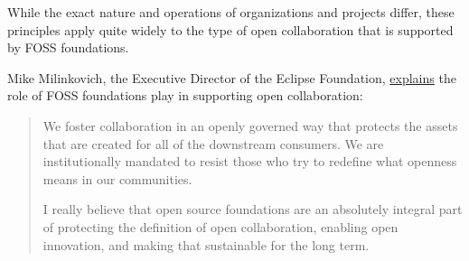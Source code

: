 While the exact nature and operations of organizations and projects differ, these principles apply quite widely to the type of open collaboration that is supported by FOSS foundations.

\begin{kaobox}[frametitle=FOSS foundations: protecting the definition of open collaboration]

Mike Milinkovich, the Executive Director of the Eclipse Foundation, \href{https://twitter.com/stephenrwalli/status/1358884485387808768}{explains} the role of FOSS foundations play in supporting open collaboration:

\begin{quote}

We foster collaboration in an openly governed way that protects the assets that are created for all of the downstream consumers. We are institutionally mandated to resist those who try to redefine what openness means in our communities.

I really believe that open source foundations are an absolutely integral part of protecting the definition of open collaboration, enabling open innovation, and making that sustainable for the long term.

\end{quote}

\end{kaobox}

